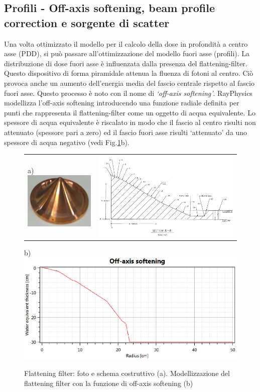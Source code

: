 \subsection{Profili - Off-axis softening, beam profile correction e sorgente di scatter}
Una volta ottimizzato il modello per il calcolo della dose in profondità a centro asse (PDD), si può passare all'ottimizzazione del modello fuori asse (profili). La distribuzione di dose fuori asse è influenzata dalla presenza del flattening-filter. Questo dispositivo di forma piramidale attenua la fluenza di fotoni al centro. Ciò provoca anche un aumento dell'energia media del fascio centrale rispetto al fascio fuori asse. Questo processo è noto con il nome di \textit{`off-axis softening'}. RayPhysics modellizza l'off-axis softening introducendo una funzione radiale definita per punti che rappresenta il flattening-filter come un oggetto di acqua equivalente. Lo spessore di acqua equivalente è riscalato in modo che il fascio al centro risulti non attenuato (spessore pari a zero) ed il fascio fuori asse risulti `attenuato' da uno spessore di acqua negativo (vedi Fig.\ref{fig:Ray_flatt}b).
\begin{figure}[!t]
\centering
\begin{tabular}{m{}m{}}
\vspace*{-0.5cm}a)\includegraphics[width=.3\textwidth]{./cap2/Ray_flatt1.png} &
\includegraphics[width=.6\textwidth]{./cap2/Ray_flatt2.png}
\end{tabular}
b)\includegraphics[width=.9\textwidth]{./cap2/Ray_flatt3.png}
\caption{Flattening filter: foto e schema costruttivo (a). Modellizzazione del flattening filter con la funzione di off-axis softening (b)}
\label{fig:Ray_flatt}
\end{figure}

